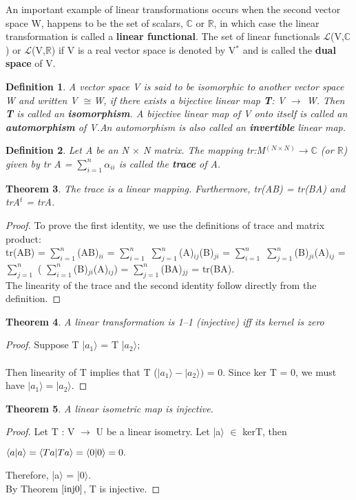 \documentclass[12pt,a4paper]{article}
\newtheorem{thm}{Theorem}
\newtheorem{defn}[thm]{Definition}
\begin{document}
An important example of linear transformations occurs when the second vector space W, happens to be the set of scalars, $\mathbb{C}$ or $\mathbb{R}$, in which case the linear transformation is called a \textbf{linear functional}. The set of linear functionals $\mathcal{L}$(V,$\mathbb{C}$) or $\mathcal{L}$(V,$\mathbb{R}$) if V is a real vector space is denoted by V$^*$ and is called the \textbf{dual space} of V.
\begin{defn}
A vector space V is said to be isomorphic to another vector space W and written V ${\cong}$W, if there exists a bijective linear map \textbf{T}:
V $\to$ W. Then \textbf{T} is called an \textbf{isomorphism}. A bijective linear map of V onto itself is called an \textbf{automorphism} of V.An automorphism is also called an \textbf{invertible} linear map. 
\end{defn}
\begin{defn}
Let A be an N $\times$ N matrix. The mapping tr:M$^{(N\times N)}$$\to$$\mathbb{C}$ (or $\mathbb{R}$) given by tr A = $\sum_{i=1}^{n}$$ \alpha_{ii} $ is called the \textbf{trace} of A.
\end{defn}
\begin{thm}
The trace is a linear mapping. Furthermore, tr(AB) = tr(BA) and trA$^t$ = trA.
\end{thm}
\begin{proof}
To prove the first identity, we use the definitions of trace and matrix product:\\
tr(AB) = $\sum_{i=1}^{n}$(AB)$_{ii} $ = $\sum_{i=1}^{n}$ $\sum_{j=1}^{n}$(A)$_{ij}$(B)$_{ji}$ =  $\sum_{i=1}^{n}$ $\sum_{j=1}^{n}$(B)$_{ji}$(A)$_{ij}$ = $\sum_{j=1}^{n}$ ( $\sum_{i=1}^{n}$(B)$_{ji}$(A)$_{ij}$) = $\sum_{j=1}^{n}$(BA)$_{jj}$ = tr(BA).\\
The linearity of the trace and the second identity follow directly from the definition.
\end{proof}

\begin{thm} \label{inj0}
A linear transformation is 1–1 (injective) iff its kernel is
zero
\end{thm}
\begin{proof}
Suppose T |$a_1\rangle$ = T |$a_2\rangle$; \\\\Then linearity of T implies that T ($|a_1\rangle - |a_2\rangle)$ = 0. Since ker T = 0, we must have $|a_1\rangle = |a_2 \rangle$.
\end{proof}
\begin{thm} \label{inj}
A linear isometric map is injective.
\end{thm}
\begin{proof}
Let T : V $\to$ U be a linear isometry. Let |a$\rangle$ $\in$ kerT, then
\begin{center}
$\braket{a | a} = \braket{Ta | Ta} = \braket{0|0} = 0.$ 
\end{center}
Therefore, |a$\rangle$ = |0$\rangle$.\\
By Theorem $\ref{inj0}$, T is injective.
\end{proof}
\end{document}
